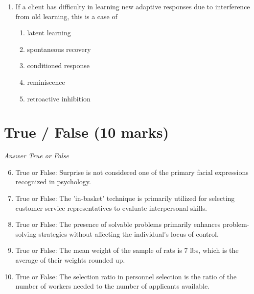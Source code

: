 \documentclass[12pt]{article}
\begin{document}
\begin{enumerate}[label=\arabic*.]
\begin{enumerate}[label=(\alph*)]
    \item a factorial research design has been used.
    \item a study's independent variable is quantitative.
    \item a cross-sectional research design has been used.
    \item a longitudinal research design has been used.
\end{enumerate}
\item If a client has difficulty in learning new adaptive responses due to interference from old learning, this is a case of
\begin{enumerate}[label=(\alph*)]
    \item latent learning
    \item spontaneous recovery
    \item conditioned response
    \item reminiscence
    \item retroactive inhibition
\end{enumerate}
\end{enumerate}

\section*{True / False (10 marks)}
\textit{Answer True or False}
\begin{enumerate}[label=\arabic*.]
\setcounter{enumi}{5}
\item True or False: Surprise is not considered one of the primary facial expressions recognized in psychology.
\item True or False: The 'in-basket' technique is primarily utilized for selecting customer service representatives to evaluate interpersonal skills.
\item True or False: The presence of solvable problems primarily enhances problem-solving strategies without affecting the individual's locus of control.
\item True or False: The mean weight of the sample of rats is 7 lbs, which is the average of their weights rounded up.
\item True or False: The selection ratio in personnel selection is the ratio of the number of workers needed to the number of applicants available.
\end{enumerate}
\end{document}
